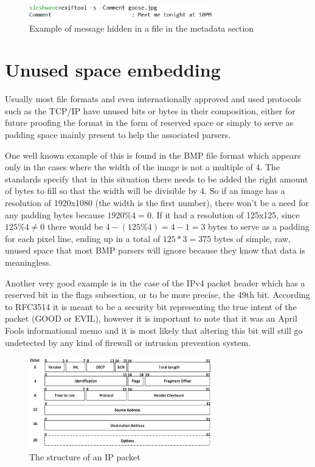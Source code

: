 \begin{multicols*}{2}
\begin{figure}[H]
    \centering
    \includegraphics[width=8cm,keepaspectratio]{pics/metadata_message_identified}
    \caption{Example of message hidden in a file in the metadata section}
    \label{MetadataMessageExample}
\end{figure}

\section{Unused space embedding}
Usually most file formats and even internationally approved and used protocols such as the TCP/IP have unused bits or bytes in their composition, either for future proofing the format in the form of reserved space or simply to serve as padding space mainly present to help the associated parsers. 

One well known example of this is found in the BMP file format which appears only in the cases where the width of the image is not a multiple of 4. The standards specify that in this situation there needs to be added the right amount of bytes to fill so that the width will be divisible by 4. So if an image has a resolution of 1920x1080 (the width is the first number), there won't be a need for any padding bytes because $1920 \% 4 = 0$. If it had a resolution of 125x125, since $125 \% 4 \neq 0$ there would be $4 - (125 \% 4) = 4 - 1 = 3$ bytes to serve as a padding for each pixel line, ending up in a total of $125 * 3 = 375$ bytes of simple, raw, unused space that most BMP parsers will ignore because they know that data is meaningless. 

Another very good example is in the case of the IPv4 packet header which has a reserved bit in the flags subsection, or to be more precise, the 49th bit. According to RFC3514\cite{RFC3514} it is meant to be a security bit representing the true intent of the packet (GOOD or EVIL), however it is important to note that it was an April Fools informational memo and it is most likely that altering this bit will still go undetected by any kind of firewall or intrusion prevention system.

\begin{figure}[H]
    \centering
    \includegraphics[width=8cm,keepaspectratio]{pics/ip_packet_specifier}
    \caption{The structure of an IP packet}
    \label{IP_Packet_Specifier}
\end{figure}


\end{multicols*}
